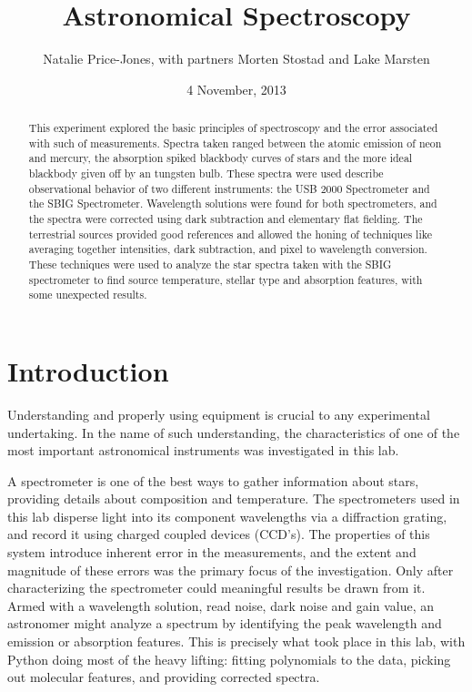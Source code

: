 \documentclass[a4paper,12pt]{article}
\begin{document}
\onehalfspacing
\title{Astronomical Spectroscopy}
\author{Natalie Price-Jones, with partners Morten Stostad and Lake Marsten}
\date{4 November, 2013}
\maketitle

\begin{abstract}
\label{abstract}

This experiment explored the basic principles of spectroscopy and the error associated with such of measurements. Spectra taken ranged between the atomic emission of neon and mercury, the absorption spiked blackbody curves of stars and the more ideal blackbody given off by an tungsten bulb. These spectra were used describe observational behavior of two different instruments: the USB 2000 Spectrometer and the SBIG Spectrometer. Wavelength solutions were found for both spectrometers, and the spectra were corrected using dark subtraction and elementary flat fielding. The terrestrial sources provided good references and allowed the honing of techniques like averaging together intensities, dark subtraction, and pixel to wavelength conversion. These techniques were used to analyze the star spectra taken with the SBIG spectrometer to find source temperature, stellar type and absorption features, with some unexpected results.

\end{abstract}

\section{Introduction}
\label{sec:introduction}

Understanding and properly using equipment is crucial to any experimental undertaking. In the name of such understanding, the characteristics of one of the most important astronomical instruments was investigated in this lab.

A spectrometer is one of the best ways to gather information about stars, providing details about composition and temperature. The spectrometers used in this lab disperse light into its component wavelengths via a diffraction grating, and record it using charged coupled devices (CCD’s). The properties of this system introduce inherent error in the measurements, and the extent and magnitude of these errors was the primary focus of the investigation. Only after characterizing the spectrometer could meaningful results be drawn from it. Armed with a wavelength solution, read noise, dark noise and gain value, an astronomer might analyze a spectrum by identifying the peak wavelength and emission or absorption features. This is precisely what took place in this lab, with Python doing most of the heavy lifting: fitting polynomials to the data, picking out molecular features, and providing corrected spectra.
\end{document}
